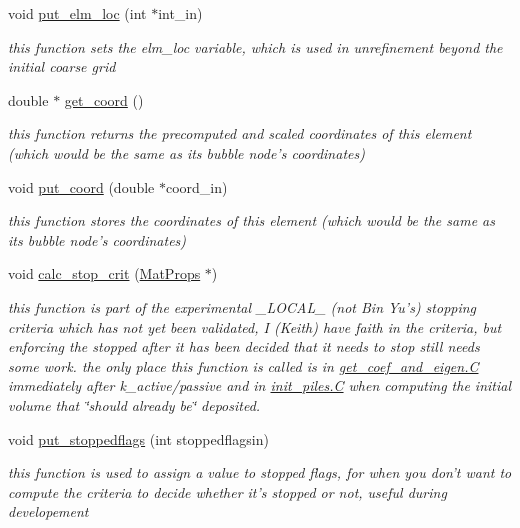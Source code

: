 \begin{CompactItemize}
void \hyperlink{classElement_a102}{put\_\-elm\_\-loc} (int $\ast$int\_\-in)
\begin{CompactList}\small\item\em this function sets the elm\_\-loc variable, which is used in unrefinement beyond the initial coarse grid \item\end{CompactList}\item 
double $\ast$ \hyperlink{classElement_a103}{get\_\-coord} ()
\begin{CompactList}\small\item\em this function returns the precomputed and scaled coordinates of this element (which would be the same as its bubble node's coordinates) \item\end{CompactList}\item 
void \hyperlink{classElement_a104}{put\_\-coord} (double $\ast$coord\_\-in)
\begin{CompactList}\small\item\em this function stores the coordinates of this element (which would be the same as its bubble node's coordinates) \item\end{CompactList}\item 
void \hyperlink{classElement_a105}{calc\_\-stop\_\-crit} (\hyperlink{structMatProps}{Mat\-Props} $\ast$)
\begin{CompactList}\small\item\em this function is part of the experimental \_\-LOCAL\_\- (not Bin Yu's) stopping criteria which has not yet been validated, I (Keith) have faith in the criteria, but enforcing the stopped after it has been decided that it needs to stop still needs some work. the only place this function is called is in \hyperlink{constant_8h_a21}{get\_\-coef\_\-and\_\-eigen.C} immediately after k\_\-active/passive and in \hyperlink{constant_8h_a21}{init\_\-piles.C} when computing the initial volume that \char`\"{}should already be\char`\"{} deposited. \item\end{CompactList}\item 
void \hyperlink{classElement_a106}{put\_\-stoppedflags} (int stoppedflagsin)
\begin{CompactList}\small\item\em this function is used to assign a value to stopped flags, for when you don't want to compute the criteria to decide whether it's stopped or not, useful during developement \item\end{CompactList}\item 

\end{CompactItemize}
